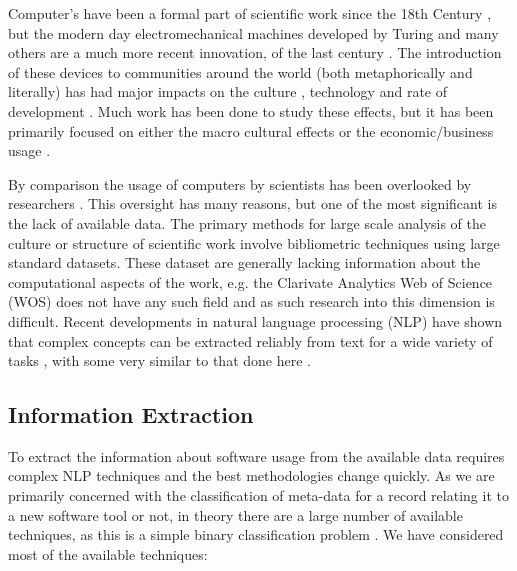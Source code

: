 \documentclass[12pt, a4paper]{article}
\begin{document}
Computer's have been a formal part of scientific work since the 18th Century \citep{grier2013computers}, but the modern day electromechanical machines developed by Turing \citep{turing1937computable} and many others \citep{abbate2012recoding}\citep{abbate2000inventing} are a much more recent innovation, of the last century \citep{bauer1972software}.  The introduction of these devices to communities around the world (both metaphorically and literally) has had major impacts on the culture \citep{lessig2007code}, technology\citep{abbate2000inventing} and rate of development \citep{bauer1972software}. Much work has been done to study these effects, but it has been primarily focused on either the macro cultural effects \citep{pfaffenberger1988social} or the economic/business usage \citep{landauer1995trouble}. 

By comparison the usage of computers by scientists has been overlooked by researchers \citep{sloanrep}. This oversight has many reasons, but one of the most significant is the lack of available data. The primary methods for large scale analysis of the culture or structure of scientific work involve bibliometric techniques \citep{de2009bibliometrics} using large standard datasets\citep[e.g.][]{Boyack2005, borner2010atlas, borner2015atlas, sugimoto2013global, shi2015weaving, evans_meta, skupin2013visualizing}. These dataset are generally lacking information about the computational aspects of the work, e.g. the  Clarivate Analytics Web of Science (WOS) does not have any such field \citep{mkdocs} and as such research into this dimension is difficult. Recent developments in natural language processing (NLP) have shown that complex concepts can be extracted reliably from text for a wide variety of tasks \citep{evans2016machine}, with some very similar to that done here \citep{foster2015tradition}.

\subsection{Information Extraction}

To extract the information about software usage from the available data requires complex NLP techniques and the best methodologies change quickly\citep{evans2016machine}. As we are primarily concerned with the classification of meta-data for a record relating it to a new software tool or not, in theory there are a large number of available techniques, as this is a simple binary classification problem \citep{james2013introduction}\citep{jurafsky2000speech}\citep{murphy2012machine}. We have considered most of the available techniques:
\end{document}
